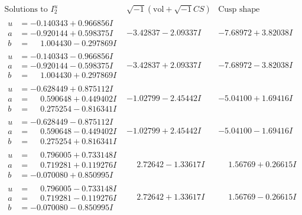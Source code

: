 \documentclass[1p]{elsarticle_modified}
\theoremstyle{definition}
\newcommand{\I}{\sqrt{-1}}
\begin{document}
$$\begin{array}{c|c|c}  
\text{Solutions to }I^u_{2}& \I (\text{vol} + \sqrt{-1}CS) & \text{Cusp shape}\\
 \hline 
\begin{aligned}
u &= -0.140343 + 0.966856 I \\
a &= -0.920144 + 0.598375 I \\
b &= \phantom{-}1.004430 - 0.297869 I\end{aligned}
 & -3.42837 - 2.09337 I & -7.68972 + 3.82038 I \\ \hline\begin{aligned}
u &= -0.140343 - 0.966856 I \\
a &= -0.920144 - 0.598375 I \\
b &= \phantom{-}1.004430 + 0.297869 I\end{aligned}
 & -3.42837 + 2.09337 I & -7.68972 - 3.82038 I \\ \hline\begin{aligned}
u &= -0.628449 + 0.875112 I \\
a &= \phantom{-}0.590648 + 0.449402 I \\
b &= \phantom{-}0.275254 - 0.816341 I\end{aligned}
 & -1.02799 - 2.45442 I & -5.04100 + 1.69416 I \\ \hline\begin{aligned}
u &= -0.628449 - 0.875112 I \\
a &= \phantom{-}0.590648 - 0.449402 I \\
b &= \phantom{-}0.275254 + 0.816341 I\end{aligned}
 & -1.02799 + 2.45442 I & -5.04100 - 1.69416 I \\ \hline\begin{aligned}
u &= \phantom{-}0.796005 + 0.733148 I \\
a &= \phantom{-}0.719281 + 0.119276 I \\
b &= -0.070080 + 0.850995 I\end{aligned}
 & \phantom{-}2.72642 - 1.33617 I & \phantom{-}1.56769 + 0.26615 I \\ \hline\begin{aligned}
u &= \phantom{-}0.796005 - 0.733148 I \\
a &= \phantom{-}0.719281 - 0.119276 I \\
b &= -0.070080 - 0.850995 I\end{aligned}
 & \phantom{-}2.72642 + 1.33617 I & \phantom{-}1.56769 - 0.26615 I \\ \hline\begin{aligned}

\end{aligned}
\end{array}$$
\end{document}
